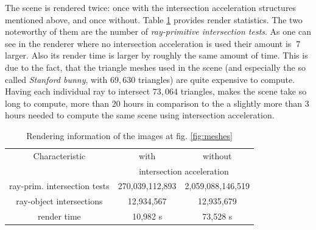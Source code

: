 \documentclass{article}
\begin{document}
The scene is rendered twice: once with the intersection acceleration structures mentioned above, and once without. Table \ref{table:acceleration_stat} provides render statistics. The two noteworthy of them are the number of \textit{ray-primitive intersection tests}. As one can see in the renderer where no intersection acceleration is used their amount is $~7$ larger. Also its render time is larger by roughly the same amount of time. This is due to the fact, that the triangle meshes used in the scene (and especially the so called \textit{Stanford bunny}, with $69,630$ triangles) are quite expensive to compute. Having each individual ray to  intersect $73,064$ triangles, makes the scene take so long to compute, more than 20 hours in comparison to the a slightly more than 3 hours needed to compute the same scene using intersection acceleration. 

\begin{table}[!ht]
\centering
	\begin{tabular}{*3c} 
		\hline
 		Characteristic & with & without \\ [0.5ex] 
 		\hfill & \multicolumn{2}{c}{intersection acceleration} \\ [0.5ex] 
 		\hline\hline
 		ray-prim. intersection tests & 270,039,112,893 & 2,059,088,146,519 \\
 		ray-object intersections & 12,934,567 & 12,935,679 \\
 		render time & 10,982 s & 73,528 s \\
 		\hline
	\end{tabular}
\caption{Rendering information of the images at fig. \ref{fig:meshes}}
\label{table:acceleration_stat}
\end{table}





\end{document}
